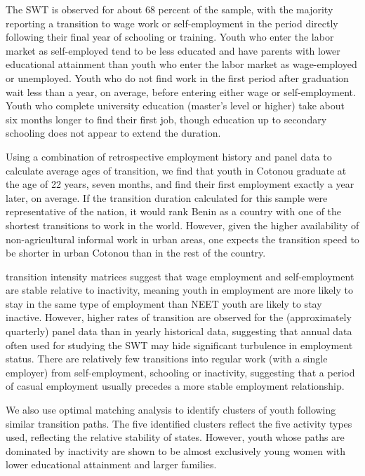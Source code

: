 \documentclass[
  11pt,
a4paper
]{article}
\begin{document}
The SWT is observed for about 68 percent of the sample, with the majority reporting a transition to wage work or self-employment in the period directly following their final year of schooling or training. Youth who enter the labor market as self-employed tend to be less educated and have parents with lower educational attainment than youth who enter the labor market as wage-employed or unemployed. Youth who do not find work in the first period after graduation wait less than a year, on average, before entering either wage or self-employment. Youth who complete university education (master's level or higher) take about six months longer to find their first job, though education up to secondary schooling does not appear to extend the duration.

Using a combination of retrospective employment history and panel data to calculate average ages of transition, we find that youth in Cotonou graduate at the age of 22 years, seven months, and find their first employment exactly a year later, on average. If the transition duration calculated for this sample were representative of the nation, it would rank Benin as a country with one of the shortest transitions to work in the world. However, given the higher availability of non-agricultural informal work in urban areas, one expects the transition speed to be shorter in urban Cotonou than in the rest of the country.

transition intensity matrices suggest that wage employment and self-employment are stable relative to inactivity, meaning youth in employment are more likely to stay in the same type of employment than NEET youth are likely to stay inactive. However, higher rates of transition are observed for the (approximately quarterly) panel data than in yearly historical data, suggesting that annual data often used for studying the SWT may hide significant turbulence in employment status. There are relatively few transitions into regular work (with a single employer) from self-employment, schooling or inactivity, suggesting that a period of casual employment usually precedes a more stable employment relationship.

We also use optimal matching analysis to identify clusters of youth following similar transition paths. The five identified clusters reflect the five activity types used, reflecting the relative stability of states. However, youth whose paths are dominated by inactivity are shown to be almost exclusively young women with lower educational attainment and larger families.
\end{document}
